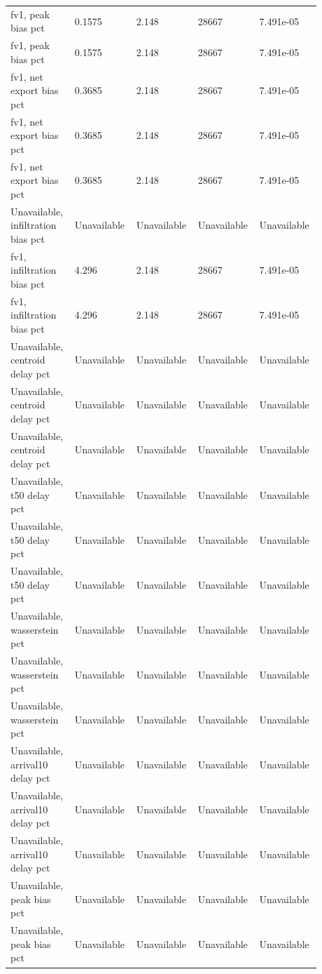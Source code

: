 \begin{longtable}{p{0.1760\linewidth}p{0.1760\linewidth}p{0.1760\linewidth}p{0.1760\linewidth}p{0.1760\linewidth}}
fv1, peak bias pct & 0.1575 & 2.148 & 28667 & 7.491e-05 \\
fv1, peak bias pct & 0.1575 & 2.148 & 28667 & 7.491e-05 \\
fv1, net export bias pct & 0.3685 & 2.148 & 28667 & 7.491e-05 \\
fv1, net export bias pct & 0.3685 & 2.148 & 28667 & 7.491e-05 \\
fv1, net export bias pct & 0.3685 & 2.148 & 28667 & 7.491e-05 \\
Unavailable, infiltration bias pct & Unavailable & Unavailable & Unavailable & Unavailable \\
fv1, infiltration bias pct & 4.296 & 2.148 & 28667 & 7.491e-05 \\
fv1, infiltration bias pct & 4.296 & 2.148 & 28667 & 7.491e-05 \\
Unavailable, centroid delay pct & Unavailable & Unavailable & Unavailable & Unavailable \\
Unavailable, centroid delay pct & Unavailable & Unavailable & Unavailable & Unavailable \\
Unavailable, centroid delay pct & Unavailable & Unavailable & Unavailable & Unavailable \\
Unavailable, t50 delay pct & Unavailable & Unavailable & Unavailable & Unavailable \\
Unavailable, t50 delay pct & Unavailable & Unavailable & Unavailable & Unavailable \\
Unavailable, t50 delay pct & Unavailable & Unavailable & Unavailable & Unavailable \\
Unavailable, wasserstein pct & Unavailable & Unavailable & Unavailable & Unavailable \\
Unavailable, wasserstein pct & Unavailable & Unavailable & Unavailable & Unavailable \\
Unavailable, wasserstein pct & Unavailable & Unavailable & Unavailable & Unavailable \\
Unavailable, arrival10 delay pct & Unavailable & Unavailable & Unavailable & Unavailable \\
Unavailable, arrival10 delay pct & Unavailable & Unavailable & Unavailable & Unavailable \\
Unavailable, arrival10 delay pct & Unavailable & Unavailable & Unavailable & Unavailable \\
Unavailable, peak bias pct & Unavailable & Unavailable & Unavailable & Unavailable \\
Unavailable, peak bias pct & Unavailable & Unavailable & Unavailable & Unavailable \\

\end{longtable}
